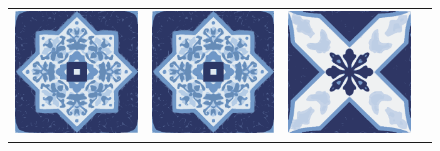 \documentclass{oci}
\begin{document}
\begin{problemDescription}
\begin{figure}[h]
\begin{center}
{\begin{tabular}{cccc}
        \includegraphics[scale=0.3]{a.eps} &
        \includegraphics[scale=0.3]{a.eps} &
        \includegraphics[scale=0.3]{b.eps}
      \end{tabular}
    }
  \end{center}
\end{figure}


\end{problemDescription}
\end{document}
